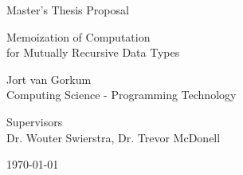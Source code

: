 \begin{titlepage}
  \fontsize{12pt}{15pt}\selectfont
  \begin{center}
    \vspace*{4cm}

    Master's Thesis Proposal

    \vspace{0.5cm}

    {
      \fontsize{20.74pt}{20.74pt}\selectfont
      \parbox[]{13cm} {
        \centering
        Memoization of Computation \\ for Mutually Recursive Data Types
      }
    }
      
    \vspace{1.25cm}
    
    Jort van Gorkum\\
    Computing Science - Programming Technology\\
    
    \vspace{1.25cm}
    
    Supervisors \\
    Dr. Wouter Swierstra, Dr. Trevor McDonell\\
    
    \vspace{1cm}

    \today
  \end{center}
\end{titlepage}